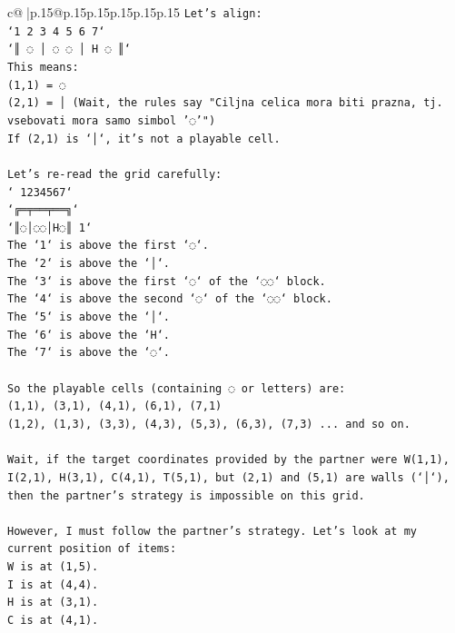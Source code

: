 \documentclass{article}
\begin{document}
{\begin{supertabular}{c@{$\;$}|p{.15\linewidth}@{}p{.15\linewidth}p{.15\linewidth}p{.15\linewidth}p{.15\linewidth}p{.15\linewidth}}
{{{\texttt{Let's align:} \\
\texttt{`1 2 3 4 5 6 7`} \\
\texttt{`║ ◌ │ ◌ ◌ │ H ◌ ║`} \\
\texttt{This means:} \\
\texttt{(1,1) = ◌} \\
\texttt{(2,1) = │ (Wait, the rules say "Ciljna celica mora biti prazna, tj. vsebovati mora samo simbol '◌'")} \\
\texttt{If (2,1) is `│`, it's not a playable cell.} \\
\\ 
\texttt{Let's re{-}read the grid carefully:} \\
\texttt{` 1234567`} \\
\texttt{`╔═╤══╤══╗`} \\
\texttt{`║◌│◌◌│H◌║ 1`} \\
\texttt{The `1` is above the first `◌`.} \\
\texttt{The `2` is above the `│`.} \\
\texttt{The `3` is above the first `◌` of the `◌◌` block.} \\
\texttt{The `4` is above the second `◌` of the `◌◌` block.} \\
\texttt{The `5` is above the `│`.} \\
\texttt{The `6` is above the `H`.} \\
\texttt{The `7` is above the `◌`.} \\
\\ 
\texttt{So the playable cells (containing ◌ or letters) are:} \\
\texttt{(1,1), (3,1), (4,1), (6,1), (7,1)} \\
\texttt{(1,2), (1,3), (3,3), (4,3), (5,3), (6,3), (7,3) ... and so on.} \\
\\ 
\texttt{Wait, if the target coordinates provided by the partner were W(1,1), I(2,1), H(3,1), C(4,1), T(5,1), but (2,1) and (5,1) are walls (`│`), then the partner's strategy is impossible on this grid.} \\
\\ 
\texttt{However, I must follow the partner's strategy. Let's look at my current position of items:} \\
\texttt{W is at (1,5).} \\
\texttt{I is at (4,4).} \\
\texttt{H is at (3,1).} \\
\texttt{C is at (4,1).} \\
}}}
\end{supertabular}}
\end{document}
